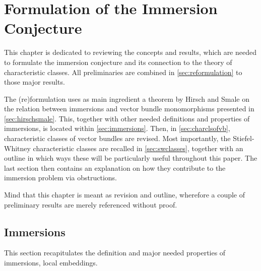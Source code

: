 % 

\chapter{Formulation of the Immersion Conjecture}
This chapter is dedicated to reviewing the concepts and results,
which are needed to formulate the immersion conjecture and its
connection to the theory of characteristic classes.
All preliminaries are combined in \autoref{sec:reformulation} to those
major results.

The (re)formulation uses as main ingredient a theorem by Hirsch
and Smale on the relation between immersions and vector bundle
monomorphisms presented in \autoref{sec:hirschsmale}.
This, together with other needed definitions and properties of
immersions, is located within \autoref{sec:immersions}.
Then, in \autoref{sec:charclsofvb}, characteristic classes of vector
bundles are revised. Most importantly, the Stiefel-Whitney
characteristic classes are recalled in \autoref{sec:swclasses},
together with an outline in which ways these will be particularly
useful throughout this paper.
The last section then contains an explanation on how they contribute
to the immersion problem via obstructions.

Mind that this chapter is meant as revision and outline, wherefore a
couple of preliminary results are merely referenced without proof.

\section{Immersions}\label{sec:immersions}
This section recapitulates the definition and major needed properties
of immersions, \idest local embeddings.

